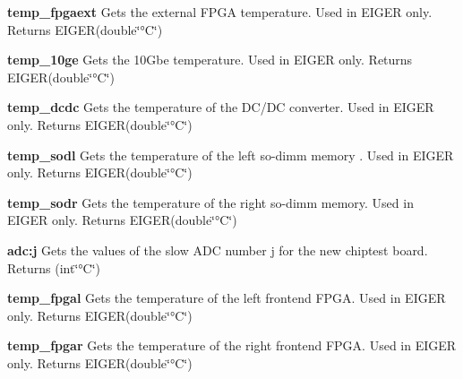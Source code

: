 \begin{DoxyItemize}
\item {\bfseries temp\_\-fpgaext} Gets the external FPGA temperature. Used in EIGER only. {\ttfamily Returns} {\ttfamily EIGER}(double\char`\"{}°C\char`\"{})
\end{DoxyItemize}


\begin{DoxyItemize}
\item {\bfseries temp\_\-10ge} Gets the 10Gbe temperature. Used in EIGER only. {\ttfamily Returns} {\ttfamily EIGER}(double\char`\"{}°C\char`\"{})
\end{DoxyItemize}


\begin{DoxyItemize}
\item {\bfseries temp\_\-dcdc} Gets the temperature of the DC/DC converter. Used in EIGER only. {\ttfamily Returns} {\ttfamily EIGER}(double\char`\"{}°C\char`\"{})
\end{DoxyItemize}


\begin{DoxyItemize}
\item {\bfseries temp\_\-sodl} Gets the temperature of the left so-\/dimm memory . Used in EIGER only. {\ttfamily Returns} {\ttfamily EIGER}(double\char`\"{}°C\char`\"{})
\end{DoxyItemize}


\begin{DoxyItemize}
\item {\bfseries temp\_\-sodr} Gets the temperature of the right so-\/dimm memory. Used in EIGER only. {\ttfamily Returns} {\ttfamily EIGER}(double\char`\"{}°C\char`\"{})
\end{DoxyItemize}


\begin{DoxyItemize}
\item {\bfseries adc:j} Gets the values of the slow ADC number j for the new chiptest board. {\ttfamily Returns} {\ttfamily }(int\char`\"{}°C\char`\"{})
\end{DoxyItemize}


\begin{DoxyItemize}
\item {\bfseries temp\_\-fpgal} Gets the temperature of the left frontend FPGA. Used in EIGER only. {\ttfamily Returns} {\ttfamily EIGER}(double\char`\"{}°C\char`\"{})
\end{DoxyItemize}


\begin{DoxyItemize}
\item {\bfseries temp\_\-fpgar} Gets the temperature of the right frontend FPGA. Used in EIGER only. {\ttfamily Returns} {\ttfamily EIGER}(double\char`\"{}°C\char`\"{})
\end{DoxyItemize}


